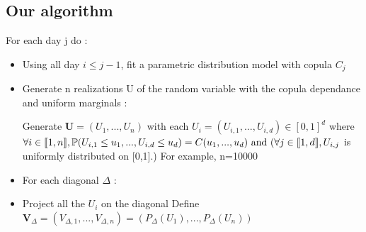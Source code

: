 \documentclass{article}
\begin{document}
	

	  
	  \subsection{Our algorithm}
	  
	  For each day j do :

\begin{itemize}

\item Using all day \begin{math}i \leq j-1\end{math}, fit a parametric distribution model with copula \begin{math} C_j \end{math}

\item Generate n realizations U of the random variable with the copula dependance and uniform marginals :\newline

	Generate \begin{math} \textbf{U}=(U_1,...,U_n) \end{math} with each \begin{math} U_i = (U_{i,1},...,U_{i,d}) \in [0,1]^d \end{math} \newline
\newline	
	 where \begin{math} \forall i \in \llbracket 1,n \rrbracket , \newline \mathbb{P} (U_{i,1} \leq u_1,..., U_{i,d} \leq u_d )= C(u_1,...,u_d) \text{ and } \newline
	( \forall j \in \llbracket 1,d \rrbracket, U_{i,j} \end{math} is uniformly distributed on [0,1].) \newline
	For example, n=10000  \newline
	
	
	
\item For each diagonal $\Delta$ : 
\item 
Project all the \begin{math} U_i \end{math} on the diagonal
\newline
	Define \begin{math} \textbf{V}_{\Delta} =(V_{\Delta ,1},...,V_{\Delta ,n})=(P_\Delta(U_1),...,P_\Delta(U_n)) \end{math}


\end{itemize}
\end{document}
